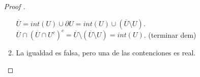 \documentclass[a4paper]{report}
\begin{document}
\begin{enumerate}
\begin{proof}[Proof ]
\begin{enumerate}
			\Ifstep $\overline{U} =  int(U) \cup \partial U = int(U) \cup (\overline{U} \setminus U)$. $\overline{U} \cap (\overline{U} \cap U^c)^c = \overline{U} \setminus (\overline{U}\setminus U) = int(U)$. (terminar dem)

			\item La igualdad es falsa, pero una de las contenciones es real.
		\end{enumerate}
	\end{proof}









\end{enumerate}















\end{document}
